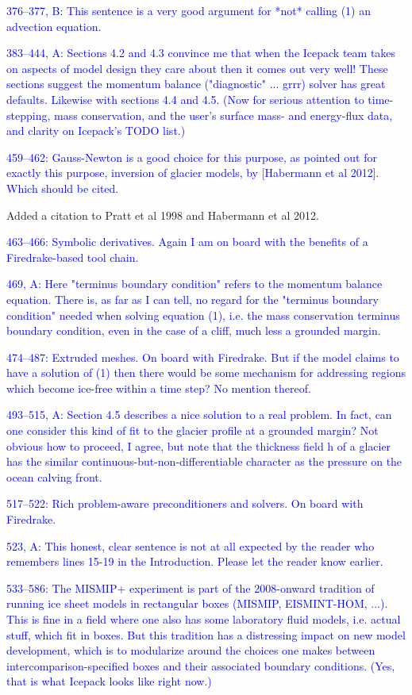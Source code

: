 \documentclass{article}
\theoremstyle{definition}
\theoremstyle{plain}
\begin{document}
\textcolor{blue}{376--377, B:  This sentence is a very good argument for *not* calling (1) an advection equation.}

\textcolor{blue}{383--444, A:  Sections 4.2 and 4.3 convince me that when the Icepack team takes on aspects of model design they care about then it comes out very well!  These sections suggest the momentum balance ("diagnostic" ... grrr) solver has great defaults.  Likewise with sections 4.4 and 4.5.  (Now for serious attention to time-stepping, mass conservation, and the user's surface mass- and energy-flux data, and clarity on Icepack's TODO list.)}

\textcolor{blue}{459--462:  Gauss-Newton is a good choice for this purpose, as pointed out for exactly this purpose, inversion of glacier models, by [Habermann et al 2012].  Which should be cited.}

Added a citation to Pratt et al 1998 and Habermann et al 2012.

\textcolor{blue}{463--466:  Symbolic derivatives.  Again I am on board with the benefits of a Firedrake-based tool chain.}

\textcolor{blue}{469, A:  Here "terminus boundary condition" refers to the momentum balance equation.  There is, as far as I can tell, no regard for the "terminus boundary condition" needed when solving equation (1), i.e. the mass conservation terminus boundary condition, even in the case of a cliff, much less a grounded margin.}

\textcolor{blue}{474--487:  Extruded meshes.  On board with Firedrake.  But if the model claims to have a solution of (1) then there would be some mechanism for addressing regions which become ice-free within a time step?  No mention thereof.}

\textcolor{blue}{493--515, A:  Section 4.5 describes a nice solution to a real problem.  In fact, can one consider this kind of fit to the glacier profile at a grounded margin?  Not obvious how to proceed, I agree, but note that the thickness field h of a glacier has the similar continuous-but-non-differentiable character as the pressure on the ocean calving front.}

\textcolor{blue}{517--522:  Rich problem-aware preconditioners and solvers.  On board with Firedrake.}

\textcolor{blue}{523, A:  This honest, clear sentence is not at all expected by the reader who remembers lines 15-19 in the Introduction.  Please let the reader know earlier.}

\textcolor{blue}{533--586:  The MISMIP+ experiment is part of the 2008-onward tradition of running ice sheet models in rectangular boxes (MISMIP, EISMINT-HOM, ...).  This is fine in a field where one also has some laboratory fluid models, i.e. actual stuff, which fit in boxes.  But this tradition has a distressing impact on new model development, which is to modularize around the choices one makes between intercomparison-specified boxes and their associated boundary conditions.  (Yes, that is what Icepack looks like right now.)}
\end{document}
